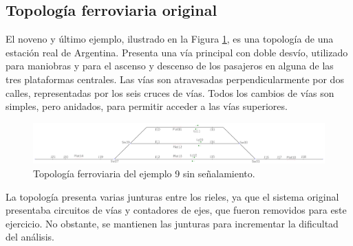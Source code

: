 \subsection{Topología ferroviaria original}

	El noveno y último ejemplo, ilustrado en la Figura \ref{fig:EJ9_1}, es una topología de una estación real de Argentina. Presenta una vía principal con doble desvío, utilizado para maniobras y para el ascenso y descenso de los pasajeros en alguna de las tres plataformas centrales. Las vías son atravesadas perpendicularmente por dos calles, representadas por los seis cruces de vías. Todos los cambios de vías son simples, pero anidados, para permitir acceder a las vías superiores.	
	
	\begin{figure}[h]
		\centering
		\includegraphics[width=1\textwidth]{resultados-obtenidos/ejemplo9/images/9_empty.png}
		\centering\caption{Topología ferroviaria del ejemplo 9 sin señalamiento.}
		\label{fig:EJ9_1}
	\end{figure}
	
	La topología presenta varias junturas entre los rieles, ya que el sistema original presentaba circuitos de vías y contadores de ejes, que fueron removidos para este ejercicio. No obstante, se mantienen las junturas para incrementar la dificultad del análisis.